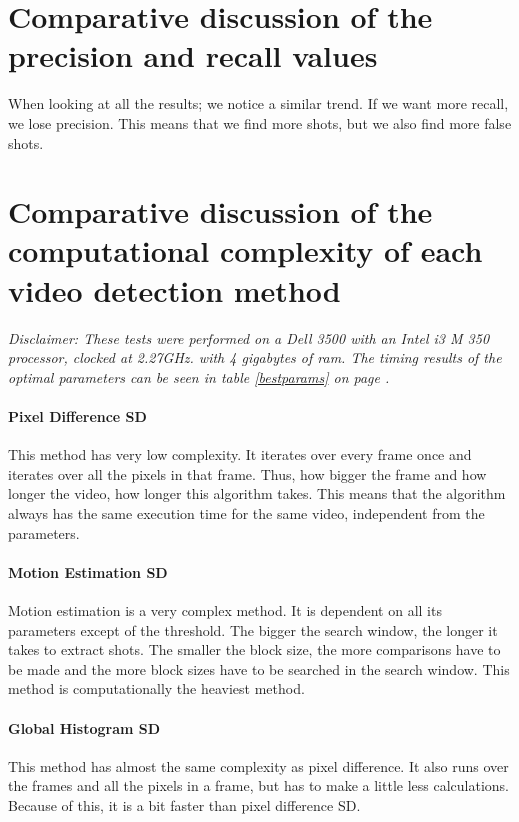 \documentclass[a4paper,10pt]{article}
\begin{document}
\section{Comparative discussion of the precision and recall values}
When looking at all the results; we notice a similar trend. If we want more recall, we lose precision. This means that we find more shots, but we also find more false shots.


\section{Comparative discussion of the computational complexity of each video detection method}
\textit{Disclaimer: These tests were performed on a Dell 3500 with an Intel i3 M 350 processor, clocked at 2.27GHz. with 4 gigabytes of ram. The timing results of the optimal parameters can be seen in table \ref{bestparams} on page \pageref{bestparams}.}

\paragraph{Pixel Difference SD} This method has very low complexity. It iterates over every frame once and iterates over all the pixels in that frame. Thus, how bigger the frame and how longer the video, how longer this algorithm takes. This means that the algorithm always has the same execution time for the same video, independent from the parameters.

\paragraph{Motion Estimation SD} Motion estimation is a very complex method. It is dependent on all its parameters except of the threshold. The bigger the search window, the longer it takes to extract shots. The smaller the block size, the more comparisons have to be made and the more block sizes have to be searched in the search window. This method is computationally the heaviest method.  

\paragraph{Global Histogram SD} This method has almost the same complexity as pixel difference. It also runs over the frames and all the pixels in a frame, but has to make a little less calculations. Because of this, it is a bit faster than pixel difference SD.
\end{document}
